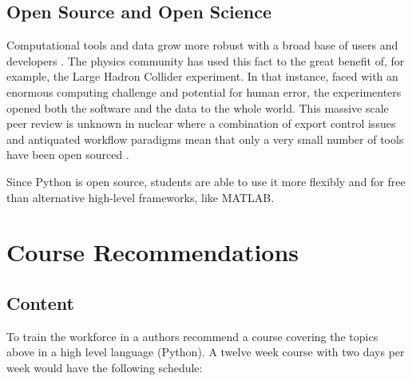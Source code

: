 \documentclass{anstrans}
\begin{document}
\subsection{Open Source and Open Science}

Computational tools and data grow more robust with a broad base of users and
developers \cite{petre_code_2014, wicherts_willingness_2013}. The physics
community has used this fact to the great benefit of, for example, the Large
Hadron Collider experiment. In that instance, faced with an enormous computing
challenge and potential for human error, the experimenters opened both the
software and the data to the whole world. This massive scale peer review is
unknown in nuclear where a combination of export control issues and antiquated
workflow paradigms mean that only a very small number of tools have been open
sourced \cite{moose}\cite{pyne}\cite{cyclus}.

Since Python is open source, students are able to use it more flexibly and for
free than alternative high-level frameworks, like MATLAB.

\section{Course Recommendations}

\subsection{Content}
To train the workforce in a authors recommend a course covering the topics
above in a high level language (Python). A twelve week course with two days per
week would have the following schedule:
\end{document}
